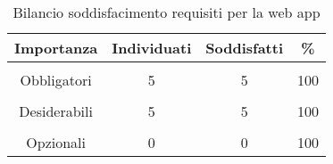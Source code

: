 \begin{table}[!h] %
	\caption{Bilancio soddisfacimento requisiti per la web app}
	\label{tab:bilancio-app}
	\centering
	\begin{tabular}{ c | c | c | c}
		\textbf{Importanza} & \textbf{Individuati} & \textbf{Soddisfatti} & \textbf{\%}\\
		\hline
		\hline
		\\[-2.5mm]
		Obbligatori & 5 & 5 & 100 \\
		\hline
		\\[-2.5mm]
		Desiderabili & 5 & 5 & 100 \\
		\hline
		\\[-2.5mm]
		Opzionali & 0 & 0 & 100 \\
		\hline
	\end{tabular}
\end{table}%